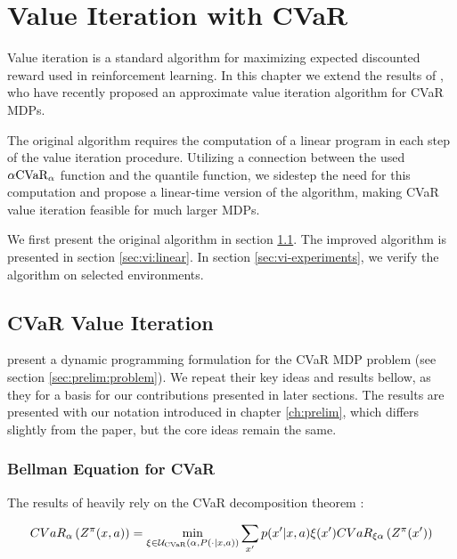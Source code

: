 \chapter{Value Iteration with CVaR}\label{ch:vi}

Value iteration is a standard algorithm for maximizing expected discounted reward used in reinforcement learning. In this chapter we extend the results of \citet{chow2015risk}, who have recently proposed an approximate value iteration algorithm for CVaR MDPs. 

The original algorithm requires the computation of a linear program in each step of the value iteration procedure. Utilizing a connection between the used $\alpha \text{CVaR}_\alpha$ function and the quantile function, we sidestep the need for this computation and propose a linear-time version of the algorithm, making CVaR value iteration feasible for much larger MDPs. 

We first present the original algorithm in section \ref{sec:vi:cvar}. The improved algorithm is presented in section \ref{sec:vi:linear}. In section \ref{sec:vi-experiments}, we verify the algorithm on selected environments.


\section{CVaR Value Iteration}\label{sec:vi:cvar}

\citet{chow2015risk} present a dynamic programming formulation for the CVaR MDP problem (see section \ref{sec:prelim:problem}).  We repeat their key ideas and results bellow, as they for a basis for our contributions presented in later sections. The results are presented with our notation introduced in chapter \ref{ch:prelim}, which differs slightly from the paper, but the core ideas remain the same.

\subsection{Bellman Equation for CVaR}

The results of \citet{chow2015risk} heavily rely on the CVaR decomposition theorem \cite{decomp}:


\begin{equation}\label{eq:vi:cvardecomp}
CVaR_\alpha\left( {Z^\pi(x, a)} \right) = \min_{\xi \in \mathcal{U}_{\text{CVaR}}(\alpha, P(\cdot | x, a))} \sum_{x'} p(x'| x, a)\xi(x') CVaR_{\xi\alpha}\left( {Z^\pi(x')} \right)
\end{equation}

